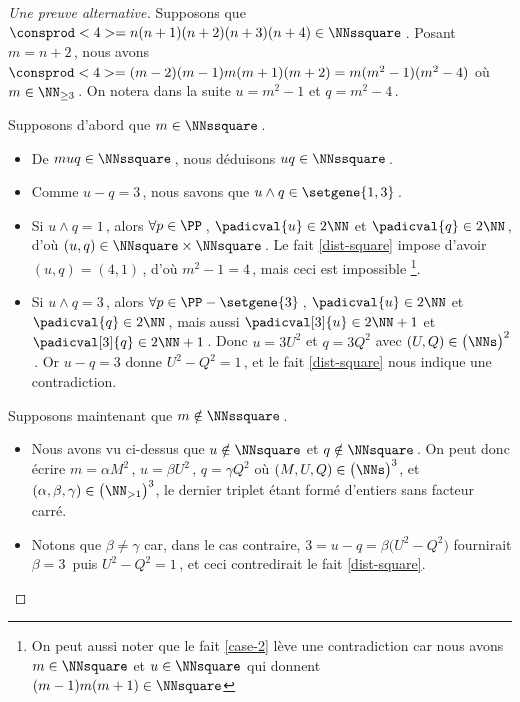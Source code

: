 \begin{proof}[Une preuve alternative]%
	Supposons que $\consprod<4> = n(n+1)(n+2)(n+3)(n+4) \in \NNssquare$\,.
	Posant $m = n+2$\,, nous avons $\consprod<4> = (m-2)(m-1)m(m+1)(m+2) = m(m^2 - 1)(m^2 - 4)$ où $m \in \NN_{\geq 3}$\,.
	On notera dans la suite $u = m^2 - 1$ et $q = m^2 - 4$\,.
	
	\medskip
	
	Supposons d'abord que $m \in \NNssquare$\,.
	\begin{itemize}
		\item De $muq \in \NNssquare$\,, nous déduisons $uq \in \NNssquare$\,.

		\item Comme $u - q = 3$\,, nous savons que $u \wedge q \in \setgene{1, 3}$\,.

		\item Si $u \wedge q = 1$\,, 
		alors $\forall p \in \PP$\,, 
		$\padicval{u} \in 2 \NN$ et $\padicval{q} \in 2 \NN$\,,
		d'où 
		$(u, q) \in \NNsquare \times \NNsquare$\,.
		Le fait \ref{dist-square} impose d'avoir $(u, q) = (4, 1)$\,, d'où $m^2 - 1 = 4$\,, mais ceci est impossible
		\footnote{
			On peut aussi noter que le fait \ref{case-2} lève une contradiction car nous avons $m \in \NNsquare$ et $u \in \NNsquare$ qui donnent $(m-1)m(m+1) \in \NNsquare$
		}.

		\item Si $u \wedge q = 3$\,, 
		alors $\forall p \in \PP - \setgene{3}$\,, 
		$\padicval{u} \in 2 \NN$ et $\padicval{q} \in 2 \NN$\,,
		mais aussi $\padicval[3]{u} \in 2 \NN + 1$ et $\padicval[3]{q} \in 2 \NN + 1$\,.
		Donc 
		$u = 3 U^2$ et $q = 3 Q^2$ avec $(U, Q) \in \big( \NNs \big)^2$\,.
		Or $u - q = 3$ donne $U^2 - Q^2 = 1$\,, et le fait \ref{dist-square} nous indique une contradiction.
	\end{itemize}
	
	\medskip
	
	Supposons maintenant que $m \notin \NNssquare$\,.
	\begin{itemize}
		\item Nous avons vu ci-dessus que $u \notin \NNsquare$ et $q \notin \NNsquare$\,. On peut donc écrire $m = \alpha M^2$\,, $u = \beta U^2$\,, $q = \gamma Q^2$ où $(M, U, Q) \in \big( \NNs \big)^3$, et $(\alpha, \beta, \gamma) \in \big( \NN_{>1} \big)^3$, le dernier triplet étant formé d'entiers sans facteur carré.


		\item Notons que $\beta \neq \gamma$ car, dans le cas contraire, $3 = u - q = \beta \big( U^2 - Q^2 \big)$ fournirait $\beta = 3$\, puis $U^2 - Q^2 = 1$\,, et ceci contredirait le fait \ref{dist-square}.



\end{itemize}
\end{proof}
